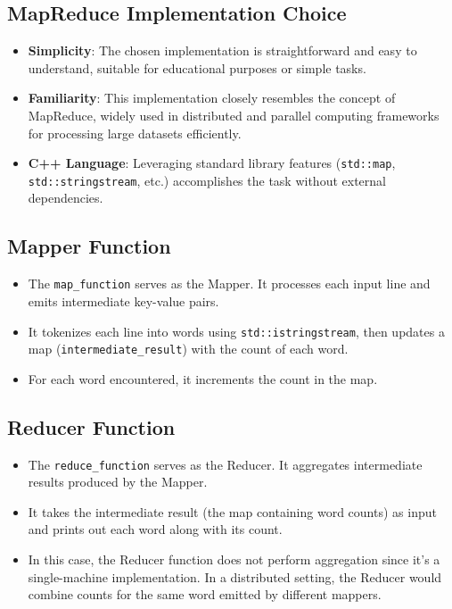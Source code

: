 \documentclass{article}
\begin{document}
\subsection{MapReduce Implementation Choice}
\begin{itemize}
    \item \textbf{Simplicity}: The chosen implementation is straightforward and easy to understand, suitable for educational purposes or simple tasks.
    \item \textbf{Familiarity}: This implementation closely resembles the concept of MapReduce, widely used in distributed and parallel computing frameworks for processing large datasets efficiently.
    \item \textbf{C++ Language}: Leveraging standard library features (\texttt{std::map}, \texttt{std::stringstream}, etc.) accomplishes the task without external dependencies.
\end{itemize}

\subsection{Mapper Function}
\begin{itemize}
    \item The \texttt{map\_function} serves as the Mapper. It processes each input line and emits intermediate key-value pairs.
    \item It tokenizes each line into words using \texttt{std::istringstream}, then updates a map (\texttt{intermediate\_result}) with the count of each word.
    \item For each word encountered, it increments the count in the map.
\end{itemize}

\subsection{Reducer Function}
\begin{itemize}
    \item The \texttt{reduce\_function} serves as the Reducer. It aggregates intermediate results produced by the Mapper.
    \item It takes the intermediate result (the map containing word counts) as input and prints out each word along with its count.
    \item In this case, the Reducer function does not perform aggregation since it's a single-machine implementation. In a distributed setting, the Reducer would combine counts for the same word emitted by different mappers.
\end{itemize}
\end{document}
